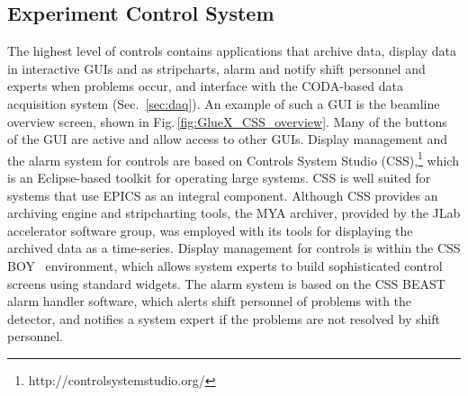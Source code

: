\subsection{Experiment Control System \label{sec:alarms}}
The highest level of controls contains applications that archive data, display data in interactive GUIs and as stripcharts, alarm and notify shift personnel and experts when problems occur, and interface with the CODA-based data acquisition system (Sec.~\ref{sec:daq}).
An example of such a GUI is the beamline overview screen, shown in Fig.\,\ref{fig:GlueX_CSS_overview}. Many of the buttons of the GUI are active and allow access to other GUIs.
Display management and the alarm system for \gx{} controls are based on Controls System Studio (CSS),\footnote{http://controlsystemstudio.org/}  which is an Eclipse-based toolkit for operating large systems. CSS is well suited for systems that use EPICS as an integral component. Although CSS provides an archiving engine and stripcharting tools, the MYA archiver,\cite{Slominski:2009icaleps} provided by the JLab accelerator software group, was employed with its tools for displaying the archived data as a time-series. Display management for \gx{} controls is within the CSS BOY~\cite{Chen:2011icaleps} environment, which allows system experts to build sophisticated control screens using standard widgets. The alarm system is based on the CSS BEAST\cite{Kasemir:2009icaleps} alarm handler software, which alerts shift personnel of problems with the detector, and notifies a system expert if the problems are not resolved by shift personnel. 